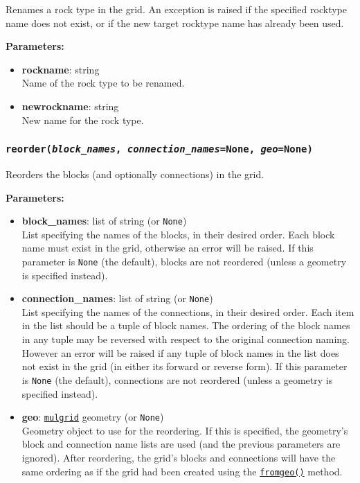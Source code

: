 Renames a rock type in the grid. An exception is raised if the specified rocktype name does not exist, or if the new target rocktype name has already been used.

\textbf{Parameters:}
\begin{itemize}
\item \textbf{rockname}: string\\
  Name of the rock type to be renamed.
\item \textbf{newrockname}: string\\
  New name for the rock type.
\end{itemize}

\begin{snugshade}
\subsubsection{\texttt{reorder(\emph{block\_names}, \emph{connection\_names}=\texttt{None}, \emph{geo}=\texttt{None})}}
\end{snugshade}
\label{sec:t2grid:reorder}

Reorders the blocks (and optionally connections) in the grid.

\textbf{Parameters:}
\begin{itemize}
\item \textbf{block\_names}: list of string (or \texttt{None})\\
  List specifying the names of the blocks, in their desired
  order. Each block name must exist in the grid, otherwise an error
  will be raised. If this parameter is \texttt{None} (the default),
  blocks are not reordered (unless a geometry is specified
  instead).
\item \textbf{connection\_names}: list of string (or \texttt{None})\\
  List specifying the names of the connections, in their desired
  order. Each item in the list should be a tuple of block names. The
  ordering of the block names in any tuple may be reversed with
  respect to the original connection naming. However an error will be
  raised if any tuple of block names in the list does not exist in the
  grid (in either its forward or reverse form). If this parameter is
  \texttt{None} (the default), connections are not reordered (unless a
  geometry is specified instead).
\item \textbf{geo}: \hyperref[mulgrids]{\texttt{mulgrid}} geometry (or \texttt{None})\\
  Geometry object to use for the reordering. If this is specified, the
  geometry's block and connection name lists are used (and the
  previous parameters are ignored). After reordering, the grid's
  blocks and connections will have the same ordering as if the grid
  had been created using the \hyperref[sec:t2grid:fromgeo]{\texttt{fromgeo()}} method.
\end{itemize}

